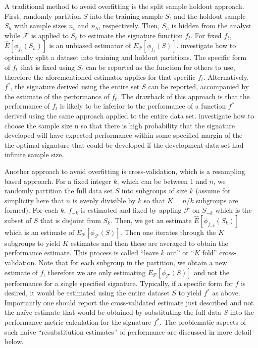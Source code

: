 \documentclass[11pt,]{article}
\begin{document}
A traditional method to avoid overfitting is the split sample holdout
approach. First, randomly partition \(S\) into the training sample
\(S_t\) and the holdout sample \(S_h\) with sample sizes \(n_t\) and
\(n_h\), respectively. Then, \(S_h\) is hidden from the analyst while
\(\mathcal{F}\) is applied to \(S_t\) to estimate the signature function
\(f_t\). For fixed \(f_t\), \(\hat{E}[\phi_{f_t}(S_h)]\) is an unbiased
estimator of \(E_{\mathcal{P}}[\phi_{f_t}(S)]\).
\citet{dobbin2011optimally} investigate how to optimally split a dataset
into training and holdout partitions. The specific form of \(f_t\) that
is fixed using \(S_t\) can be reported as the function for others to
use, therefore the aforementioned estimator applies for that specific
\(f_t\). Alternatively, \(f^*\), the signature derived using the entire
set \(S\) can be reported, accompanied by the estimate of the
performance of \(f_t\). The drawback of this approach is that the
performance of \(f_t\) is likely to be inferior to the performance of a
function \(f^*\) derived using the same approach applied to the entire
data set. \citet{dobbin2007sample} investigate how to choose the sample
size n so that there is high probability that the signature developed
will have expected performance within some specified margin of the the
optimal signature that could be developed if the development data set
had infinite sample size.

Another approach to avoid overfitting is cross-validation, which is a
resampling based approach. For a fixed integer \(k\), which can be
between 1 and \(n\), we randomly partition the full data set \(S\) into
subgroups of size \(k\) (assume for simplicity here that \(n\) is evenly
divisible by \(k\) so that \(K = n/k\) subgroups are formed). For each
\(k\), \(f_{-k}\) is estimated and fixed by appling \(\mathcal{F}\) on
\(S_{-k}\) which is the subset of \(S\) that is disjoint from \(S_k\).
Then, we get an estimate \(\hat{E}[\phi_{f_{-k}}(S_k)]\) which is an
estimate of \(E_{\mathcal{P}}[\phi_{\mathcal{F}}(S)]\). Then one
iterates through the \(K\) subgroups to yield \(K\) estimates and then
these are averaged to obtain the performance estimate. This process is
called ``leave \(k\) out'' or ``\(K\) fold'' cross-validation. Note that
for each subgroup in the partition, we obtain a new estimate of \(f\),
therefore we are only estimating
\(E_{\mathcal{P}}[\phi_{\mathcal{F}}(S)]\) and not the performance for a
single specified signature. Typically, if a specific form for \(f\) is
desired, it would be estimated using the entire dataset \(S\) to yield
\(f^*\) as above. Importantly one should report the cross-validated
estimate just described and not the naïve estimate that would be
obtained by substituting the full data \(S\) into the performance metric
calculation for the signature \(f^*\). The problematic aspects of such
naive ``resubstitution estimates'' of performance are discussed in more
detail below.
\end{document}

